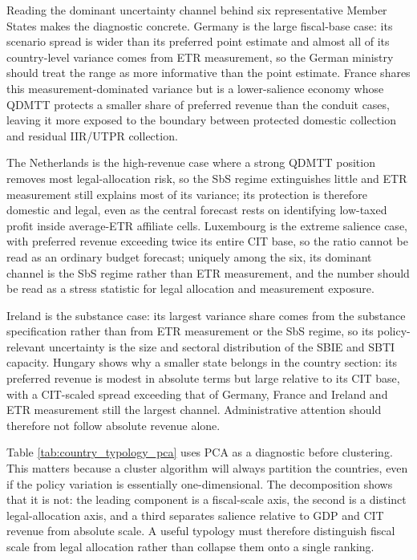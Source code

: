 \documentclass[11pt,a4paper]{article}
\begin{document}
Reading the dominant uncertainty channel behind six representative Member States makes the diagnostic concrete. Germany is the large fiscal-base case: its scenario spread is wider than its preferred point estimate and almost all of its country-level variance comes from ETR measurement, so the German ministry should treat the range as more informative than the point estimate. France shares this measurement-dominated variance but is a lower-salience economy whose QDMTT protects a smaller share of preferred revenue than the conduit cases, leaving it more exposed to the boundary between protected domestic collection and residual IIR/UTPR collection.

The Netherlands is the high-revenue case where a strong QDMTT position removes most legal-allocation risk, so the SbS regime extinguishes little and ETR measurement still explains most of its variance; its protection is therefore domestic and legal, even as the central forecast rests on identifying low-taxed profit inside average-ETR affiliate cells. Luxembourg is the extreme salience case, with preferred revenue exceeding twice its entire CIT base, so the ratio cannot be read as an ordinary budget forecast; uniquely among the six, its dominant channel is the SbS regime rather than ETR measurement, and the number should be read as a stress statistic for legal allocation and measurement exposure.

Ireland is the substance case: its largest variance share comes from the substance specification rather than from ETR measurement or the SbS regime, so its policy-relevant uncertainty is the size and sectoral distribution of the SBIE and SBTI capacity. Hungary shows why a smaller state belongs in the country section: its preferred revenue is modest in absolute terms but large relative to its CIT base, with a CIT-scaled spread exceeding that of Germany, France and Ireland and ETR measurement still the largest channel. Administrative attention should therefore not follow absolute revenue alone.



Table \ref{tab:country_typology_pca} uses PCA as a diagnostic before clustering. This matters because a cluster algorithm will always partition the countries, even if the policy variation is essentially one-dimensional. The decomposition shows that it is not: the leading component is a fiscal-scale axis, the second is a distinct legal-allocation axis, and a third separates salience relative to GDP and CIT revenue from absolute scale. A useful typology must therefore distinguish fiscal scale from legal allocation rather than collapse them onto a single ranking. 
\end{document}
